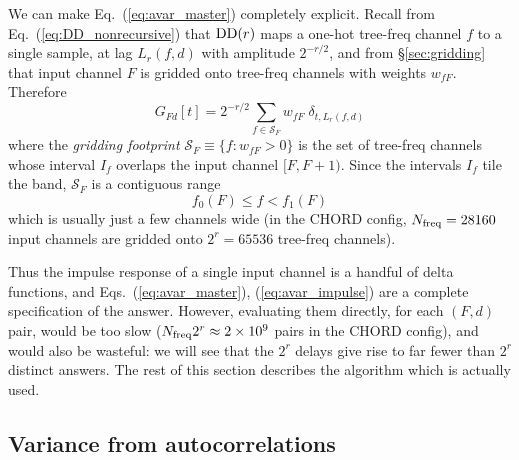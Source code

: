 \documentclass{article}
\numberwithin{equation}{section}   %
\def\DD{{\rm DD}}
\begin{document}
We can make Eq.\ (\ref{eq:avar_master}) completely explicit. Recall from
Eq.\ (\ref{eq:DD_nonrecursive}) that $\DD(r)$ maps a one-hot tree-freq channel $f$ to a single
sample, at lag $L_r(f,d)$ with amplitude $2^{-r/2}$, and from \S\ref{sec:gridding} that input
channel $F$ is gridded onto tree-freq channels with weights $w_{fF}$. Therefore
\begin{equation}
G_{Fd}[t] = 2^{-r/2} \sum_{f \in {\mathcal S}_F} w_{fF} \; \delta_{t, L_r(f,d)}
  \label{eq:avar_impulse}
\end{equation}
where the {\em gridding footprint} ${\mathcal S}_F \equiv \{ f : w_{fF} > 0 \}$ is the set of
tree-freq channels whose interval $I_f$ overlaps the input channel $[F,F+1)$. Since the intervals
$I_f$ tile the band, ${\mathcal S}_F$ is a contiguous range
\begin{equation}
f_0(F) \le f < f_1(F)
\end{equation}
which is usually just a few channels wide (in the CHORD config, $N_{\rm freq} = 28160$ input
channels are gridded onto $2^r = 65536$ tree-freq channels).

Thus the impulse response of a single input channel is a handful of delta functions, and
Eqs.\ (\ref{eq:avar_master}), (\ref{eq:avar_impulse}) are a complete specification of the answer.
However, evaluating them directly, for each $(F,d)$ pair, would be too slow
($N_{\rm freq} 2^r \approx 2 \times 10^9$ pairs in the CHORD config), and would also be wasteful:
we will see that the $2^r$ delays give rise to far fewer than $2^r$ distinct answers.
The rest of this section describes the algorithm which is actually used.

\subsection{Variance from autocorrelations}
\label{sec:avar_convolver}
\end{document}

